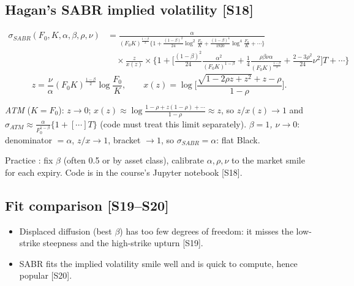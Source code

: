 \documentclass[10pt]{article}
\begin{document}
\subsection{Hagan's SABR implied volatility [S18]}
\begin{align*}
\sigma_{SABR}(F_0,K,\alpha,\beta,\rho,\nu)&=\frac{\alpha}{(F_0K)^{\frac{1-\beta}{2}}\Big\{1+\frac{(1-\beta)^2}{24}\log^2\frac{F_0}{K}+\frac{(1-\beta)^4}{1920}\log^4\frac{F_0}{K}+\cdots\Big\}}\\
&\quad\times\frac{z}{x(z)}\times\Big\{1+\Big[\frac{(1-\beta)^2}{24}\frac{\alpha^2}{(F_0K)^{1-\beta}}+\frac14\frac{\rho\beta\nu\alpha}{(F_0K)^{\frac{1-\beta}{2}}}+\frac{2-3\rho^2}{24}\nu^2\Big]T+\cdots\Big\}
\end{align*}
\[z=\frac\nu\alpha(F_0K)^{\frac{1-\beta}{2}}\log\frac{F_0}{K},\qquad x(z)=\log\Big[\frac{\sqrt{1-2\rho z+z^2}+z-\rho}{1-\rho}\Big].\]
\begin{where}
\end{where}
\begin{deriv}
\emph{ATM} ($K=F_0$): $z\to0$; $x(z)\approx\log\frac{1-\rho+z(1-\rho)+\cdots}{1-\rho}\approx z$, so $z/x(z)\to1$ and $\sigma_{ATM}\approx\frac{\alpha}{F_0^{1-\beta}}\{1+[\cdots]T\}$ (code must treat this limit separately). \emph{$\beta=1$, $\nu\to0$}: denominator $=\alpha$, $z/x\to1$, bracket $\to1$, so $\sigma_{SABR}=\alpha$: flat Black.
\end{deriv}
Practice \beyond: fix $\beta$ (often 0.5 or by asset class), calibrate $\alpha,\rho,\nu$ to the market smile for each expiry. Code is in the course's Jupyter notebook [S18].

\subsection{Fit comparison [S19--S20]}
\begin{itemize}
\item Displaced diffusion (best $\beta$) has too few degrees of freedom: it misses the low-strike steepness and the high-strike upturn [S19].
\item SABR fits the implied volatility smile well and is quick to compute, hence popular [S20].
\end{itemize}
\end{document}

